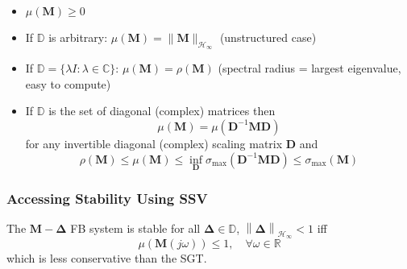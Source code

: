 \begin{itemize}
    \item $\mu(\mathbf{M})\geq0$
    \item If $\mathbb{D}$ is arbitrary: $\mu(\mathbf{M})=\|\mathbf{M}\|_{\mathcal{H}_\infty}$ (unstructured case)
    \item If $\mathbb{D}=\{\lambda I:\lambda\in\mathbb{C}\}$: $\mu(\mathbf{M})=\rho(\mathbf{M})$ (spectral radius = largest eigenvalue, easy to compute)
    \item If $\mathbb{D}$ is the set of diagonal (complex) matrices then
          \begin{equation*}
              \mu(\mathbf{M})=\mu(\mathbf{D}^{-1}\mathbf{MD})
          \end{equation*}
          for any invertible diagonal (complex) scaling matrix $\mathbf{D}$ and
          \begin{equation*}
              \rho(\mathbf{M})\leq\mu(\mathbf{M})\leq\inf_{\mathbf{D}}\sigma_{\max}(\mathbf{D}^{-1}\mathbf{MD})\leq\sigma_{\max}(\mathbf{M})
          \end{equation*}
\end{itemize}

\subsubsection{Accessing Stability Using SSV}

The $\mathbf{M}-\boldsymbol{\Delta}$ FB system is stable for all $\boldsymbol{\Delta}\in \mathbb{D}$, $\left\|\boldsymbol{\Delta}\right\|_{\mathcal{H}_\infty}<1$ iff
\begin{equation*}
    \mu(\mathbf{M}(j\omega))\leq1,\quad\forall\omega\in\mathbb{R}
\end{equation*}
which is less conservative than the SGT.


